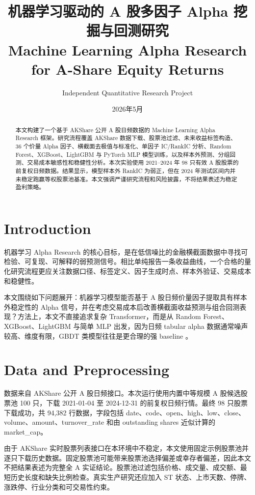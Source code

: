 \documentclass[twocolumn,UTF8]{ctexart}
\title{\textbf{机器学习驱动的 A 股多因子 Alpha 挖掘与回测研究}\\
\large Machine Learning Alpha Research for A-Share Equity Returns}
\author{Independent Quantitative Research Project}
\date{2026年5月}
\begin{document}
\maketitle

\begin{abstract}
本文构建了一个基于 AKShare 公开 A 股日频数据的 Machine Learning Alpha Research 框架。研究流程覆盖 AKShare 数据下载、股票池过滤、未来收益标签构造、36 个价量 Alpha 因子、横截面去极值与标准化、单因子 IC/RankIC 分析、Random Forest、XGBoost、LightGBM 与 PyTorch MLP 模型训练，以及样本外预测、分组回测、交易成本敏感性和稳健性分析。本次实验使用 2021--2024 年 98 只有效 A 股股票的前复权日频数据。结果显示，模型样本外 RankIC 为弱正，但在 2024 年测试区间内并未稳定跑赢等权股票池基准。本文强调严谨研究流程和风险披露，不将结果表述为稳定盈利策略。
\end{abstract}

\section{Introduction}
机器学习 Alpha Research 的核心目标，是在低信噪比的金融横截面数据中寻找可检验、可复现、可解释的弱预测信号。相比单纯报告一条收益曲线，一个合格的量化研究流程更应关注数据口径、标签定义、因子生成时点、样本外验证、交易成本和稳健性。

本文围绕如下问题展开：机器学习模型能否基于 A 股日频价量因子提取具有样本外稳定性的 Alpha 信号，并在考虑交易成本后改善横截面收益预测与组合回测表现？方法上，本文不直接追求复杂 Transformer，而是从 Random Forest、XGBoost、LightGBM 与简单 MLP 出发，因为日频 tabular alpha 数据通常噪声较高、维度有限，GBDT 类模型往往是更合理的强 baseline \cite{gu2020empirical,chen2016xgboost,ke2017lightgbm}。

\section{Data and Preprocessing}
数据来自 AKShare 公开 A 股日频接口。本次运行使用内置中等规模 A 股候选股票池 100 只，下载 2021-01-04 至 2024-12-31 的前复权日频行情。最终 98 只股票下载成功，共 94,382 行数据，字段包括 date、code、open、high、low、close、volume、amount、turnover\_rate 和由 outstanding shares 近似计算的 market\_cap。

由于 AKShare 实时股票列表接口在本环境中不稳定，本文使用固定示例股票池并逐只下载历史数据。固定股票池可能带来股票池选择偏差或幸存者偏差，因此本文不把结果表述为完整全 A 实证结论。股票池过滤包括价格、成交量、成交额、最短历史长度和缺失比例检查。真实生产研究还应加入 ST 状态、上市天数、停牌、涨跌停、行业分类和可交易性约束。
\end{document}
